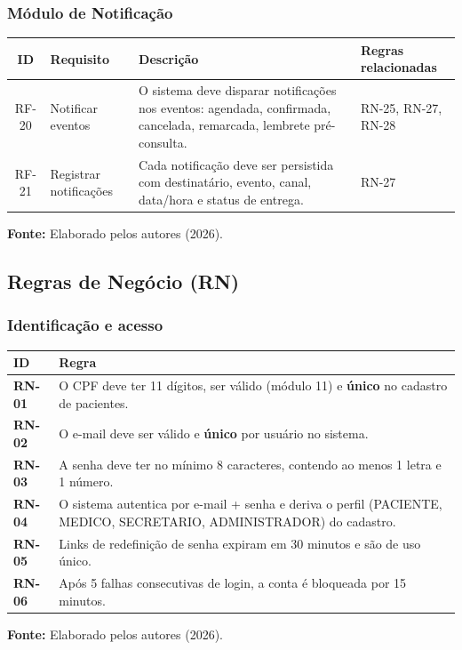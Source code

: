 \documentclass[12pt,a4paper]{article}
\newcommand{\fonte}[1]{%
  \par\vspace{2pt}%
  {\footnotesize\raggedright\textbf{Fonte:} #1\par}%
}
\begin{document}
\subsubsection{Módulo de Notificação}

\begin{table}[H]
\centering
{\footnotesize
\begin{tabularx}{\textwidth}{@{}c>{\raggedright\arraybackslash}p{2.9cm}>{\raggedright\arraybackslash}X>{\raggedright\arraybackslash}p{2.7cm}@{}}
\toprule
ID & Requisito & Descrição & Regras relacionadas \\
\midrule
RF-20 & Notificar eventos & O sistema deve disparar notificações nos eventos: agendada, confirmada, cancelada, remarcada, lembrete pré-consulta. & RN-25, RN-27, RN-28 \\
RF-21 & Registrar notificações & Cada notificação deve ser persistida com destinatário, evento, canal, data/hora e status de entrega. & RN-27 \\
\bottomrule
\end{tabularx}
}
\fonte{Elaborado pelos autores (2026).}
\end{table}

\subsection{Regras de Negócio (RN)}\label{sec:rn}

\subsubsection{Identificação e acesso}

\begin{table}[H]
\centering
{\footnotesize
\begin{tabularx}{\textwidth}{@{}>{\raggedright\arraybackslash}p{1.8cm}>{\raggedright\arraybackslash}X@{}}
\toprule
ID & Regra \\
\midrule
\textbf{RN-01} & O CPF deve ter 11 dígitos, ser válido (módulo 11) e \textbf{único} no cadastro de pacientes. \\
\textbf{RN-02} & O e-mail deve ser válido e \textbf{único} por usuário no sistema. \\
\textbf{RN-03} & A senha deve ter no mínimo 8 caracteres, contendo ao menos 1 letra e 1 número. \\
\textbf{RN-04} & O sistema autentica por e-mail + senha e deriva o perfil (PACIENTE, MEDICO, SECRETARIO, ADMINISTRADOR) do cadastro. \\
\textbf{RN-05} & Links de redefinição de senha expiram em 30 minutos e são de uso único. \\
\textbf{RN-06} & Após 5 falhas consecutivas de login, a conta é bloqueada por 15 minutos. \\
\bottomrule
\end{tabularx}
}
\fonte{Elaborado pelos autores (2026).}
\end{table}
\end{document}
